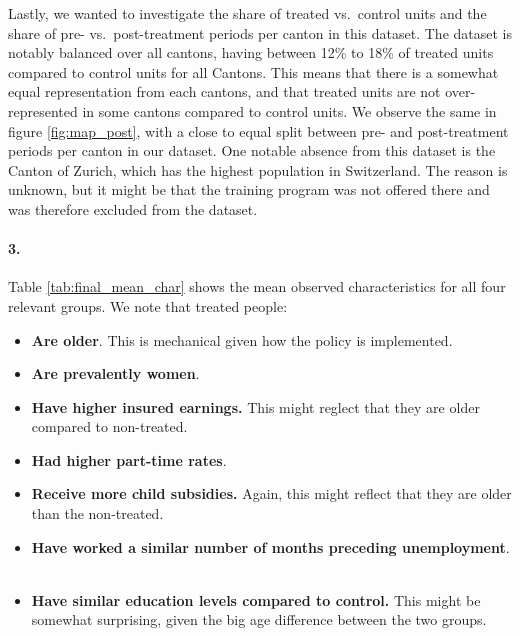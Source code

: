 \documentclass{scrartcl}
\begin{document}
Lastly, we wanted to investigate the share of treated vs.\ control units and the share of pre- vs.\ post-treatment periods per canton in this dataset. The dataset is notably balanced over all cantons, having between 12\% to 18\% of treated units compared to control units for all Cantons. This means that there is a somewhat equal representation from each cantons, and that treated units are not over-represented in some cantons compared to control units. We observe the same in figure \ref{fig:map_post}, with a close to equal split between pre- and post-treatment periods per canton in our dataset. One notable absence from this dataset is the Canton of Zurich, which has the highest population in Switzerland. The reason is unknown, but it might be that the training program was not offered there and was therefore excluded from the dataset.


  
\paragraph*{3.}

Table \ref{tab:final_mean_char} shows the mean observed characteristics for all four relevant groups. We note that treated people:

\begin{itemize}[label=$\blacktriangleright$]
    \item \textbf{Are older}. This is mechanical given how the policy is implemented. \
    \item \textbf{Are prevalently women}. \
    \item \textbf{Have higher insured earnings.} This might reglect that they are older compared to non-treated. \
    \item \textbf{Had higher part-time rates}. \
    \item \textbf{Receive more child subsidies.} Again, this might reflect that they are older than the non-treated. \
    \item \textbf{Have worked a similar number of months preceding unemployment}. \ 
    \item \textbf{Have similar education levels compared to control.} This might be somewhat surprising, given the big age difference between the two groups. 
    
\end{itemize}
\end{document}
